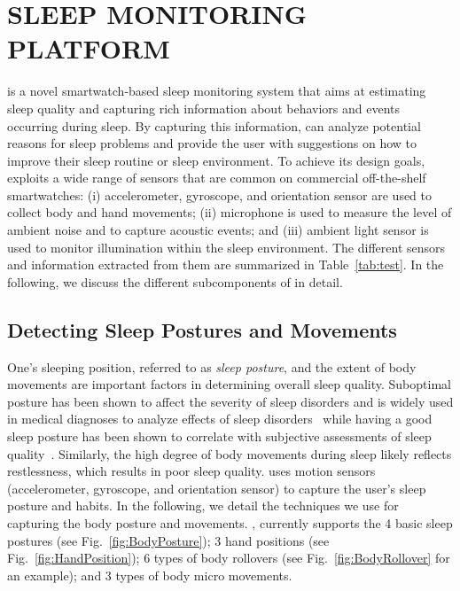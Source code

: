 \section{{\systemname} SLEEP MONITORING PLATFORM}\label{Sec:2design}

{\systemname} is a novel smartwatch-based sleep monitoring system that aims at estimating sleep quality and capturing rich information about behaviors and events occurring during sleep. By capturing this information, {\systemname} can analyze potential reasons for sleep problems and provide the user with suggestions on how to improve their sleep routine or sleep environment. To achieve its design goals, {\systemname} exploits a wide range of sensors that are common on commercial off-the-shelf smartwatches: (i) accelerometer, gyroscope, and orientation sensor are used to collect body and hand movements; (ii) microphone is used to measure the level of ambient noise and to capture acoustic events; and (iii) ambient light sensor is used to monitor illumination within the sleep environment. The different sensors and information extracted from them are summarized in Table~\ref{tab:test}. In the following, we discuss the different subcomponents of {\systemname} in detail.


\subsection{Detecting Sleep Postures and Movements}

One's sleeping position, referred to as {\em sleep posture}, and the extent of body movements are important factors in determining overall sleep quality. Suboptimal posture has been shown to affect the severity of sleep disorders and is widely used in medical diagnoses to analyze effects of sleep disorders~\cite{oksenberg1998effect,eiseman2012impact} while having a good sleep posture has been shown to correlate with subjective assessments of sleep quality~\cite{dekoninck83sleep}. Similarly, the high degree of body movements during sleep likely reflects restlessness, which results in poor sleep quality. {\systemname} uses motion sensors (accelerometer, gyroscope, and orientation sensor) to capture the user's sleep posture and habits. In the following, we detail the techniques we use for capturing the body posture and movements.  {\systemname}, currently supports the 4 basic sleep postures (see Fig.~\ref{fig:BodyPosture}); 3 hand positions (see Fig.~\ref{fig:HandPosition}); 6 types of body rollovers (see Fig.~\ref{fig:BodyRollover} for an example); and 3 types of body micro movements.

